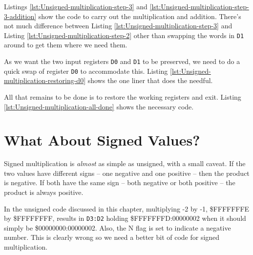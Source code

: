 

Listings \ref{lst:Unsigned-multiplication-step-3} and \ref{lst:Unsigned-multiplication-step-3-addition}
show the code to carry out the multiplication and addition. There's
not much difference between Listing \ref{lst:Unsigned-multiplication-step-3}
and Listing \ref{lst:Unsigned-multiplication-step-2} other than swapping
the words in \texttt{D1} around to get them where we need them. 

As we want the two input registers \texttt{D0} and \texttt{D1} to
be preserved, we need to do a quick swap of register \texttt{D0} to
accommodate this. Listing \ref{lst:Unsigned-multiplication-restoring-d0}
shows the one liner that does the needful.





All that remains to be done is to restore the working registers and
exit. Listing \ref{lst:Unsigned-multiplication-all-done} shows the
necessary code.

\section{What About Signed Values?}

Signed multiplication is \emph{almost} as simple as unsigned, with
a small caveat. If the two values have different signs -- one negative
and one positive -- then the product is negative. If both have the
same sign -- both negative or both positive -- the product is always
positive.

In the unsigned code discussed in this chapter, multiplying -2 by
-1, \$FFFFFFFE by \$FFFFFFFF, results in \texttt{D3:D2} holding \$FFFFFFFD:00000002
when it should simply be \$00000000:00000002. Also, the N flag is
set to indicate a negative number. This is clearly wrong so we need
a better bit of code for signed multiplication.

